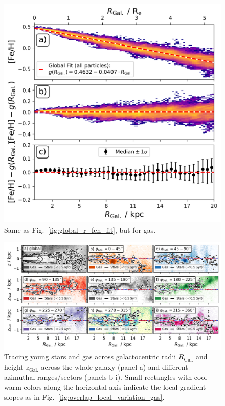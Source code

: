 \documentclass[fleqn,usenatbib]{mnras}
\begin{document}
\begin{figure}
    \centering
    \includegraphics[width=\columnwidth]{figures/global_r_feh_fit_gas.png}
    \caption{Same as Fig.~\ref{fig:global_r_feh_fit}, but for gas.}
    \label{fig:global_r_feh_fit_gas}
\end{figure}

\begin{figure}
    \centering
    \includegraphics[width=\columnwidth]{figures/tracing_young_stars_and_gas_in_angles.png}
    \caption{Tracing young stars and gas across galactocentric radii $R_\mathrm{Gal.}$ and height $z_\mathrm{Gal.}$ across the whole galaxy (panel a) and different azimuthal ranges/sectors (panels b-i). Small rectangles with cool-warm colors along the horizontal axis indicate the local gradient slopes as in Fig.~\ref{fig:overlap_local_variation_gas}.}
    \label{fig:tracing_young_stars_and_gas_in_angles}
\end{figure}
\end{document}
